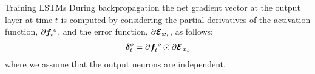 %
\begin{frame}{Training LSTMs}
During backpropagation the net gradient vector at the output layer at
time $t$ is computed by considering the
partial derivatives of the activation function, $\partial{\boldsymbol f}^{\;o}_t$,
and the error function, $\partial{\bm{\mathcal E}}_{{\boldsymbol x}_t}$, as follows:
\begin{align*}
    {\bm \delta}^o_t = \partial{\boldsymbol f}^{\;o}_t \odot \partial{\bm{\mathcal E}}_{{\boldsymbol x}_t}
\end{align*}
where we assume that the output neurons are independent.
%
%

\end{frame}
